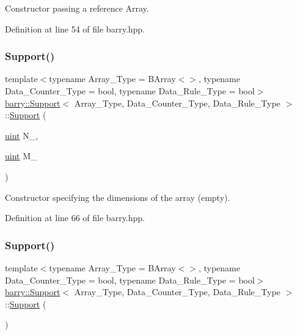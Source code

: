 Constructor passing a reference Array. 



Definition at line 54 of file barry.\+hpp.

\mbox{\label{classbarry_1_1_support_a0deea9b8e83fd418dfad59fb4cfb2ad5}} 
\subsubsection{\texorpdfstring{Support()}{Support()}\hspace{0.1cm}{\footnotesize\ttfamily [2/3]}}
{\footnotesize\ttfamily template$<$typename Array\+\_\+\+Type  = B\+Array$<$$>$, typename Data\+\_\+\+Counter\+\_\+\+Type  = bool, typename Data\+\_\+\+Rule\+\_\+\+Type  = bool$>$ \\
\hyperlink{classbarry_1_1_support}{barry\+::\+Support}$<$ Array\+\_\+\+Type, Data\+\_\+\+Counter\+\_\+\+Type, Data\+\_\+\+Rule\+\_\+\+Type $>$\+::\hyperlink{classbarry_1_1_support}{Support} (\begin{DoxyParamCaption}\item[{\hyperlink{namespacebarry_a11dfc53ddb4672278319aa04f1e09a6c}{uint}}]{N\+\_\+,  }\item[{\hyperlink{namespacebarry_a11dfc53ddb4672278319aa04f1e09a6c}{uint}}]{M\+\_\+ }\end{DoxyParamCaption})\hspace{0.3cm}{\ttfamily [inline]}}



Constructor specifying the dimensions of the array (empty). 



Definition at line 66 of file barry.\+hpp.

\mbox{\label{classbarry_1_1_support_a08a48546e91c5259a26be4cde31ef902}} 
\subsubsection{\texorpdfstring{Support()}{Support()}\hspace{0.1cm}{\footnotesize\ttfamily [3/3]}}
{\footnotesize\ttfamily template$<$typename Array\+\_\+\+Type  = B\+Array$<$$>$, typename Data\+\_\+\+Counter\+\_\+\+Type  = bool, typename Data\+\_\+\+Rule\+\_\+\+Type  = bool$>$ \\
\hyperlink{classbarry_1_1_support}{barry\+::\+Support}$<$ Array\+\_\+\+Type, Data\+\_\+\+Counter\+\_\+\+Type, Data\+\_\+\+Rule\+\_\+\+Type $>$\+::\hyperlink{classbarry_1_1_support}{Support} (\begin{DoxyParamCaption}{ }\end{DoxyParamCaption})\hspace{0.3cm}{\ttfamily [inline]}}



